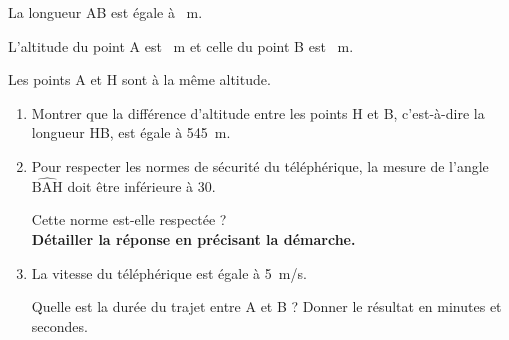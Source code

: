 \documentclass[exercice,a4]{thedocument}%
\begin{document}
\begin{center}
\end{center}

La longueur AB est égale à ~m.

L'altitude du point A est ~m et celle du point B est ~m.

Les points A et H sont à la même altitude.

\begin{enumerate}
	\item Montrer que la différence d'altitude entre les points H et B, c'est-à-dire la longueur HB, est égale à 545~m.
	\item Pour respecter les normes de sécurité du téléphérique, la mesure de l'angle $\widehat{\mathrm{BAH}}$ doit être inférieure à 30\degres.

	Cette norme est-elle respectée ?\\
	\textbf{Détailler la réponse en précisant la démarche.}
	\item La vitesse du téléphérique est égale à 5~m/s.

	Quelle est la durée du trajet entre A et B ? Donner le résultat en minutes et secondes.
\end{enumerate}

\medskip
\showthesource
\end{document}
